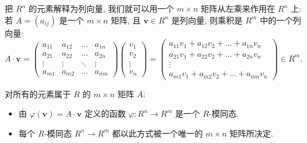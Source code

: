 把 $R^n$ 的元素解释为列向量, 我们就可以用一个 $m\times n$ 矩阵从左乘来作用在 $R^n$ 上: 若 $A=(a_{ij})$ 是一个 $m\times n$ 矩阵, 且 $\mathbf{v}\in R^n$ 是列向量, 则乘积是 $R^m$ 中的一个列向量:
\[
A\cdot\mathbf{v} = \begin{pmatrix}
a_{11} & a_{12} & \dots & a_{1n}\\
a_{21} & a_{22} & \dots & a_{2n}\\
\vdots & \vdots & \ddots & \vdots\\
a_{m1} & a_{m2} & \dots & a_{mn}
\end{pmatrix}
\begin{pmatrix} v_1\\ v_2\\ \vdots\\ v_n\end{pmatrix}
= \begin{pmatrix}
a_{11}v_1+a_{12}v_2+\dots+a_{1n}v_n\\
a_{21}v_1+a_{22}v_2+\dots+a_{2n}v_n\\
\vdots\\
a_{m1}v_1+a_{m2}v_2+\dots+a_{mn}v_n
\end{pmatrix} \in R^m.
\]

\begin{lemma}\label{lem:matrix-hom}
对所有的元素属于 $R$ 的 $m\times n$ 矩阵 $A$:
\begin{itemize}
\item 由 $\varphi(\mathbf{v})=A\cdot\mathbf{v}$ 定义的函数 $\varphi:R^n\to R^m$ 是一个 $R$-模同态.
\item 每个 $R$-模同态 $R^n\to R^m$ 都以此方式被一个唯一的 $m\times n$ 矩阵所决定.
\end{itemize}
\end{lemma}


